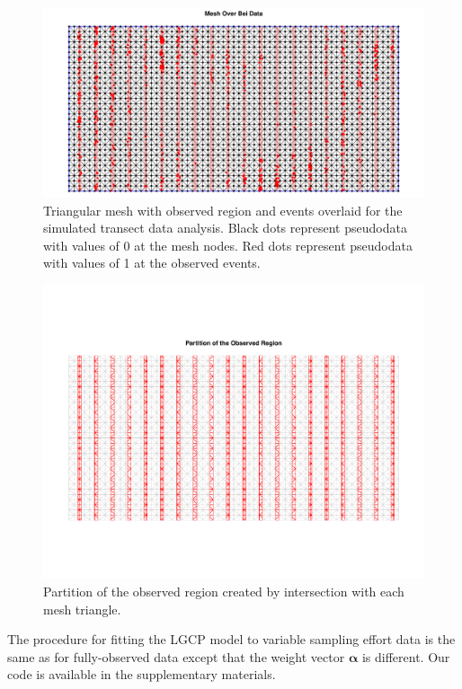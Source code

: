 \documentclass[]{interact}
\begin{document}
\begin{figure}[h!]
\includegraphics[width=\textwidth]{figures/bei-effort_mesh.pdf}
\caption{Triangular mesh with observed region and events overlaid for the
simulated transect data analysis. Black dots represent pseudodata with values
of 0 at the mesh nodes. Red dots represent pseudodata with values of 1 at the
observed events.}
\label{effortmesh}
\end{figure}

\begin{figure}[h!]
\includegraphics[width=\textwidth]{figures/bei-effort_partition.pdf}
\caption{Partition of the observed region created by intersection with each
mesh triangle.}
\label{effortpartition}
\end{figure}

The procedure for fitting the LGCP model to variable sampling effort data is
the same as for fully-observed data except that the weight vector
\(\boldsymbol{\alpha}\) is different. Our code is available in the
supplementary materials.
\end{document}
